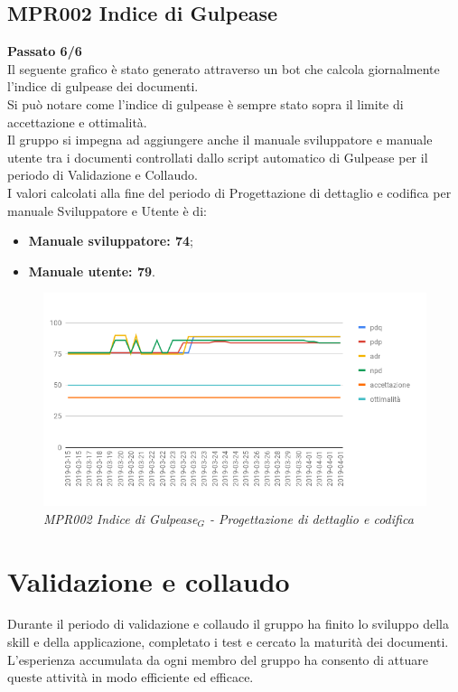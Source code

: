 \subsection{MPR002 Indice di Gulpease}
\textbf{Passato 6/6}\\
Il seguente grafico è stato generato attraverso un bot che calcola giornalmente l'indice di gulpease dei documenti.\\
Si può notare come l'indice di gulpease è sempre stato sopra il limite di accettazione e ottimalità.\\
Il gruppo si impegna ad aggiungere anche il manuale sviluppatore e manuale utente tra i documenti controllati dallo script automatico di Gulpease per il periodo di Validazione e Collaudo.\\I valori calcolati alla fine del periodo di Progettazione di dettaglio e codifica per manuale Sviluppatore e Utente è di:
\begin{itemize}
	\item \textbf{Manuale sviluppatore: 74};
	\item \textbf{Manuale utente: 79}.
\end{itemize}
\begin{figure} [H]
    \centering
	\includegraphics[scale=0.5]{./images/gulpeasePDC.png}
    \caption{\textit{MPR002 \textit{Indice di Gulpease$_{G}$} - Progettazione di dettaglio e codifica}}
\end{figure}






\section{Validazione e collaudo}
Durante il periodo di validazione e collaudo il gruppo ha finito lo sviluppo della skill e della applicazione, completato i test e cercato la maturità dei documenti. L'esperienza accumulata da ogni membro del gruppo ha consento di attuare queste attività in modo efficiente ed efficace.\\
